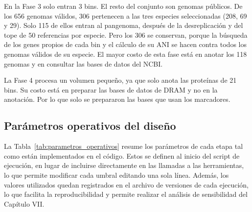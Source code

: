 En la Fase 3 solo entran 3 bins. El resto del conjunto son genomas públicos. 
De los 656 genomas válidos, 306 pertenecen a las tres especies seleccionadas 
(208, 69 y 29). Solo 115 de ellos entran al pangenoma, después de la desreplicación 
y del tope de 50 referencias por especie. Pero los 306 se conservan, porque la 
búsqueda de los genes propios de cada bin y el cálculo de su ANI se hacen contra 
todos los genomas válidos de su especie. El mayor costo de esta fase está en anotar
los 118 genomas y en consultar las bases de datos del NCBI.

\begin{nuevo}
La Fase 4 procesa un volumen pequeño, ya que solo anota las proteínas de 21
bins. Su costo está en preparar las bases de datos de DRAM y no en la
anotación. Por lo que solo se prepararon las bases que usan los marcadores.
\end{nuevo}

\subsection{Parámetros operativos del diseño}

La Tabla~\ref{tab:parametros_operativos} resume los parámetros de cada etapa tal
como están implementados en el código. Estos se definen al inicio del script de
ejecución, en lugar de incluirse directamente en las llamadas a las herramientas,
lo que permite modificar cada umbral editando una sola línea. Además, los valores
utilizados quedan registrados en el archivo de versiones de cada ejecución, lo
que facilita la reproducibilidad y permite realizar el análisis de sensibilidad del Capítulo VII.

